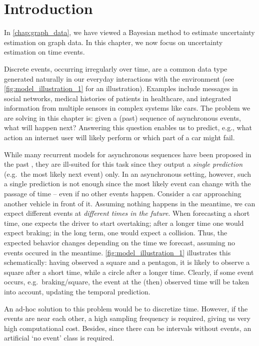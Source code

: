 \section{Introduction}
\label{sec:introduction_010}

In \cref{chap:graph_data}, we have viewed a Bayesian method to estimate uncertainty estimation on graph data. In this chapter, we now focus on uncertainty estimation on time events.

Discrete events, occurring irregularly over time, are a common data type generated naturally in our everyday interactions with the environment (see \cref{fig:model_illustration_1} for an illustration). Examples include messages in social networks, medical histories of patients in healthcare, and integrated information from multiple sensors in complex systems like cars. The problem we are solving in this chapter is: given a (past) sequence of asynchronous events, what will happen next? Answering this question enables us to predict, e.g., what action an internet user will likely perform or which part of a car might fail.

While many recurrent models for asynchronous sequences have been proposed in the past \cite{PhasedLstm, RMTPP}, they are ill-suited for this task since they output a \textit{single prediction} (e.g.\ the most likely next event) only. In an asynchronous setting, however, such a single prediction is not enough since the most likely event can change with the passage of time -- even if no other events happen. Consider a car approaching another vehicle in front of it. Assuming nothing happens in the meantime, we can expect different events at \textit{different times in the future}. When forecasting a short time, one expects the driver to start overtaking; after a longer time one would expect braking; in the long term, one would expect a collision. Thus, the expected behavior changes depending on the time we forecast, assuming no events occured in the meantime. \cref{fig:model_illustration_1} illustrates this schematically: having observed a square and a pentagon, it is likely to observe a square after a short time, while a circle after a longer time. Clearly, if some event occurs, e.g.\ braking/square, the event at the (then) observed time will be taken into account, updating the temporal prediction.

An ad-hoc solution to this problem would be to discretize time. However, if the events are near each other, a high sampling frequency is required, giving us very high computational cost. Besides, since there can be intervals without events, an artificial `no event' class is required.

